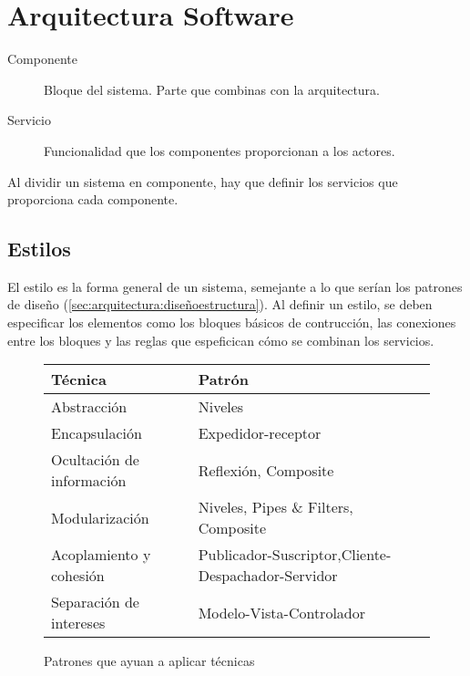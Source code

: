 \section{Arquitectura Software}
\label{sec:arquitectura:arquitectura}


\begin{description}
\item[Componente] Bloque del sistema. Parte que combinas con la arquitectura.
\item[Servicio] Funcionalidad que los componentes proporcionan a los actores.
\end{description}

Al dividir un sistema en componente, hay que definir los servicios que
proporciona cada componente.

\subsection{Estilos}
\label{sec:estilos}

El estilo es la forma general de un sistema, semejante a lo que serían
los patrones de diseño (\ref{sec:arquitectura:diseñoestructura}). Al
definir un estilo, se deben especificar los elementos como los bloques
básicos de contrucción, las conexiones entre los bloques y las reglas
que espeficican cómo se combinan los servicios.

\begin{figure}[h]
  \centering
  \begin{tabular}{l | l}
    \textbf{Técnica}&\textbf{Patrón}\\\hline
    Abstracción&Niveles \\
    Encapsulación & Expedidor-receptor \\
    Ocultación de información&Reflexión, Composite \\
    Modularización&Niveles, Pipes \& Filters, Composite\\
    Acoplamiento y
    cohesión&Publicador-Suscriptor,Cliente-Despachador-Servidor\\
    Separación de intereses&Modelo-Vista-Controlador
  \end{tabular}
  \caption{Patrones que ayuan a aplicar técnicas}
  \label{fig:patronesestilo}
\end{figure}

